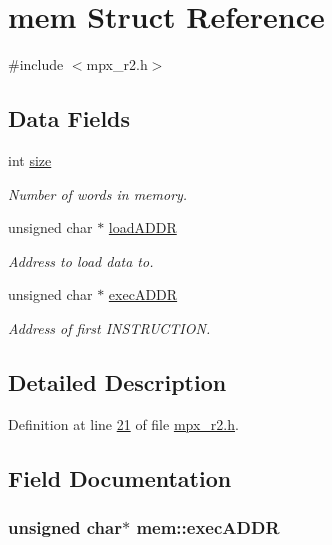\hypertarget{structmem}{
\section{mem Struct Reference}
\label{structmem}
}


{\ttfamily \#include $<$mpx\_\-r2.h$>$}

\subsection*{Data Fields}
\begin{DoxyCompactItemize}
\item 
int \hyperlink{structmem_a2f6285207fccce5cfe6a24037bd780c3}{size}
\begin{DoxyCompactList}\small\item\em Number of words in memory. \item\end{DoxyCompactList}\item 
unsigned char $\ast$ \hyperlink{structmem_a8f5a4db03ee0560e6bd4dd602ad753c0}{loadADDR}
\begin{DoxyCompactList}\small\item\em Address to load data to. \item\end{DoxyCompactList}\item 
unsigned char $\ast$ \hyperlink{structmem_a5340491e17307817e6dca3b1d260d18a}{execADDR}
\begin{DoxyCompactList}\small\item\em Address of first INSTRUCTION. \item\end{DoxyCompactList}\end{DoxyCompactItemize}


\subsection{Detailed Description}


Definition at line \hyperlink{mpx__r2_8h_source_l00021}{21} of file \hyperlink{mpx__r2_8h_source}{mpx\_\-r2.h}.



\subsection{Field Documentation}
\hypertarget{structmem_a5340491e17307817e6dca3b1d260d18a}{
\subsubsection[{execADDR}]{\setlength{\rightskip}{0pt plus 5cm}unsigned char$\ast$ {\bf mem::execADDR}}}
\label{structmem_a5340491e17307817e6dca3b1d260d18a}


